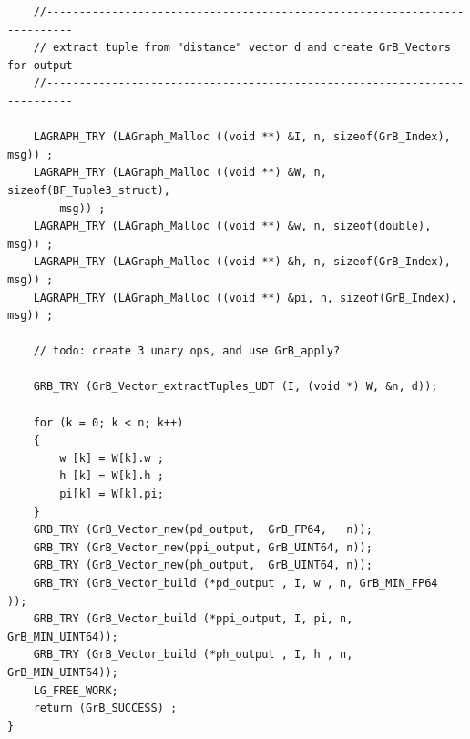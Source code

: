 \begin{verbatim}
    //--------------------------------------------------------------------------
    // extract tuple from "distance" vector d and create GrB_Vectors for output
    //--------------------------------------------------------------------------

    LAGRAPH_TRY (LAGraph_Malloc ((void **) &I, n, sizeof(GrB_Index), msg)) ;
    LAGRAPH_TRY (LAGraph_Malloc ((void **) &W, n, sizeof(BF_Tuple3_struct),
        msg)) ;
    LAGRAPH_TRY (LAGraph_Malloc ((void **) &w, n, sizeof(double), msg)) ;
    LAGRAPH_TRY (LAGraph_Malloc ((void **) &h, n, sizeof(GrB_Index), msg)) ;
    LAGRAPH_TRY (LAGraph_Malloc ((void **) &pi, n, sizeof(GrB_Index), msg)) ;

    // todo: create 3 unary ops, and use GrB_apply?

    GRB_TRY (GrB_Vector_extractTuples_UDT (I, (void *) W, &n, d));

    for (k = 0; k < n; k++)
    {
        w [k] = W[k].w ;
        h [k] = W[k].h ;
        pi[k] = W[k].pi;
    }
    GRB_TRY (GrB_Vector_new(pd_output,  GrB_FP64,   n));
    GRB_TRY (GrB_Vector_new(ppi_output, GrB_UINT64, n));
    GRB_TRY (GrB_Vector_new(ph_output,  GrB_UINT64, n));
    GRB_TRY (GrB_Vector_build (*pd_output , I, w , n, GrB_MIN_FP64  ));
    GRB_TRY (GrB_Vector_build (*ppi_output, I, pi, n, GrB_MIN_UINT64));
    GRB_TRY (GrB_Vector_build (*ph_output , I, h , n, GrB_MIN_UINT64));
    LG_FREE_WORK;
    return (GrB_SUCCESS) ;
}

\end{verbatim}